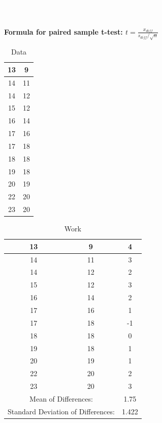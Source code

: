 \documentclass[12pt]{article}
\begin{document}
	\chead{}
	
	

	
	{\textcolor{white}.}
	

	
	\section*{}

{\LARGE \textbf{Formula for paired sample t-test:  $t = \frac{x_{diff}}{s_{diff}/\sqrt{n}}$}}


\begin{table}
\centering
\caption{Data}

\begin{tabular}{|c|c|}
\hline
13 & 9 \\
\hline
14 &11  \\
\hline
14 & 12 \\
\hline
15 & 12 \\
\hline
16 & 14 \\
\hline
17 &16  \\
\hline
17 & 18 \\
\hline
18 & 18 \\
\hline
19 &18  \\
\hline
20 & 19 \\
\hline
22 & 20 \\
\hline
23 & 20 \\
\hline
\hline
\end{tabular}
\end{table}
	
	
\newpage

\begin{table}
\centering
\caption{Work}

\begin{tabular}{|c|c|c|}
\hline
13 &9  &  4\\
\hline
14 & 11 &  3\\
\hline
14 &12  &2  \\
\hline
 15& 12 & 3 \\
\hline
16 & 14 &2  \\
\hline
17 & 16 & 1 \\
\hline
17 &18  & -1 \\
\hline
18 &18  &  0\\
\hline
19 &18  & 1 \\
\hline
20 &19  & 1 \\
\hline
22 &20  & 2 \\
\hline
23 &20  & 3 \\
\hline
\multicolumn{2}{|c|}{Mean of Differences:} & 1.75 \\
\hline
\multicolumn{2}{|c|}{Standard Deviation of Differences:} & 1.422 \\
\hline
\hline
\end{tabular}
\end{table}
\end{document}
